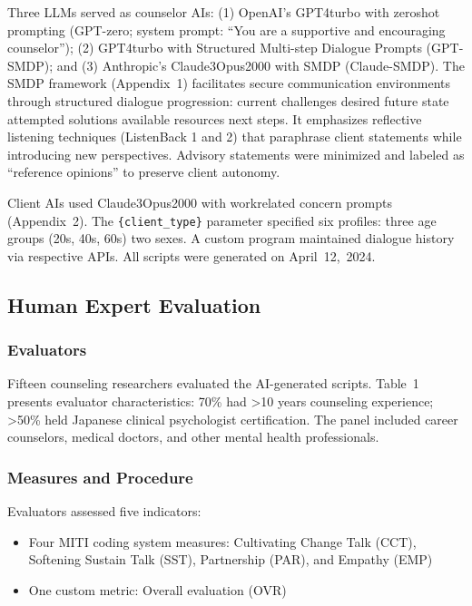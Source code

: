 \documentclass{wiley-article}
\begin{document}
Three LLMs served as counselor AIs: (1) OpenAI's GPT\textendash{}4\textendash{}turbo with zero\textendash{}shot prompting (GPT-zero; system prompt: ``You are a supportive and encouraging counselor''); (2) GPT\textendash{}4\textendash{}turbo with Structured Multi-step Dialogue Prompts (GPT-SMDP); and (3) Anthropic's Claude\textendash{}3\textendash{}Opus\textendash{}2000 with SMDP (Claude-SMDP). The SMDP framework (Appendix~1) facilitates secure communication environments through structured dialogue progression: current challenges \textrightarrow{} desired future state \textrightarrow{} attempted solutions \textrightarrow{} available resources \textrightarrow{} next steps. It emphasizes reflective listening techniques (Listen\textendash{}Back 1 and 2) that paraphrase client statements while introducing new perspectives. Advisory statements were minimized and labeled as ``reference opinions'' to preserve client autonomy.

Client AIs used Claude\textendash{}3\textendash{}Opus\textendash{}2000 with work\textendash{}related concern prompts (Appendix~2). The \texttt{\{client\_type\}} parameter specified six profiles: three age groups (20s, 40s, 60s) \texttimes{} two sexes. A custom program maintained dialogue history via respective APIs. All scripts were generated on April~12,~2024.

\subsection*{Human Expert Evaluation}

\subsubsection*{Evaluators}
Fifteen counseling researchers evaluated the AI-generated scripts. Table~1 presents evaluator characteristics: 70\% had >10 years counseling experience; >50\% held Japanese clinical psychologist certification. The panel included career counselors, medical doctors, and other mental health professionals.

\subsubsection*{Measures and Procedure}
Evaluators assessed five indicators:
\begin{itemize}
    \item Four MITI coding system measures: Cultivating Change Talk (CCT), Softening Sustain Talk (SST), Partnership (PAR), and Empathy (EMP)
    \item One custom metric: Overall evaluation (OVR)
\end{itemize}
\end{document}
